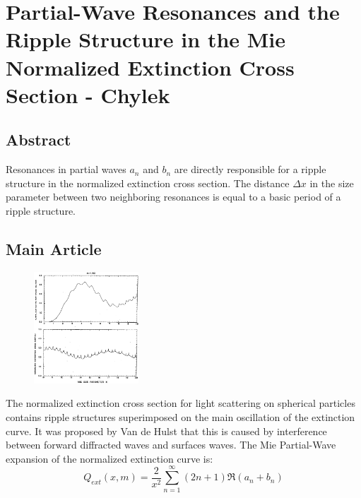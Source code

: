 \documentclass[oneside]{book}
\theoremstyle{mystyle}
\begin{document}
\section{Partial-Wave Resonances and the Ripple Structure in the Mie Normalized Extinction Cross Section - Chylek}
\subsection{Abstract}
\noindent Resonances in partial waves $a_{n}$ and $b_{n}$ are directly responsible for a ripple structure in the normalized extinction cross section. The distance $\Delta x$ in the size parameter between two neighboring resonances is equal to a basic period of a ripple structure. 
\subsection{Main Article}
\begin{figure}
	\centering
	\includegraphics[width = 0.35\textwidth]{CHYLEK_1}
\end{figure}
\noindent The normalized extinction cross section for light scattering on spherical particles contains ripple structures superimposed on the main oscillation of the extinction curve. It was proposed by Van de Hulst that this is caused by interference between forward diffracted waves and surfaces waves. The Mie Partial-Wave expansion of the normalized extinction curve is:
\begin{equation}
Q_{ext}(x,m) = \frac{2}{x^2}\sum_{n=1}^{\infty} (2n+1)\Re(a_n+b_n)
\end{equation}
\end{document}
